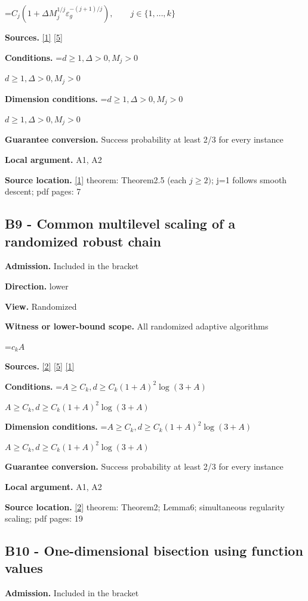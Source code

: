 \documentclass[10pt,a4paper]{article}
\newcommand{\AtlasMath}[1]{\par\begingroup\centering\setbox0=\hbox{$\displaystyle #1$}\ifdim\wd0>1.4\linewidth\typeout{ATLAS WIDE FORMULA: \the\wd0}\fi\ifdim\wd0>\linewidth\resizebox{\linewidth}{!}{\box0}\else\box0\fi\par\endgroup}
\newcommand{\AtlasInlineMath}[1]{\begingroup\setbox0=\hbox{$#1$}\ifdim\wd0>.4\linewidth\endgroup\AtlasMath{#1}\else\endgroup$#1$\fi}
\begin{document}
\AtlasMath{C_j(1+\Delta M_j^{1/j}\varepsilon_g^{-(j+1)/j}),\qquad j\in\{1,\ldots,k\}}
\textbf{Sources.} \href{https://optimization-online.org/wp-content/uploads/2015/06/4970.pdf}{[1]} \href{https://arxiv.org/abs/1710.11606v3}{[5]}

\textbf{Conditions.} \AtlasInlineMath{d\ge 1, \Delta>0, M_j>0}

\textbf{Dimension conditions.} \AtlasInlineMath{d\ge 1, \Delta>0, M_j>0}

\textbf{Guarantee conversion.} Success probability at least 2/3 for every instance

\textbf{Local argument.} A1, A2

\textbf{Source location.} \href{https://optimization-online.org/wp-content/uploads/2015/06/4970.pdf}{[1]} theorem: Theorem2.5 (each $j\ge 2)$; j=1 follows smooth descent; pdf pages: 7

\subsection{B9 - Common multilevel scaling of a randomized robust chain}
\textbf{Admission.} Included in the bracket

\textbf{Direction.} lower

\textbf{View.} Randomized

\textbf{Witness or lower-bound scope.} All randomized adaptive algorithms

\AtlasMath{c_k A}
\textbf{Sources.} \href{https://arxiv.org/abs/1710.11606}{[2]} \href{https://arxiv.org/abs/1710.11606v3}{[5]} \href{https://optimization-online.org/wp-content/uploads/2015/06/4970.pdf}{[1]}

\textbf{Conditions.} \AtlasInlineMath{A\ge C_k, d\ge C_k(1+A)^2 \log(3+A)}

\textbf{Dimension conditions.} \AtlasInlineMath{A\ge C_k, d\ge C_k(1+A)^2 \log(3+A)}

\textbf{Guarantee conversion.} Success probability at least 2/3 for every instance

\textbf{Local argument.} A1, A2

\textbf{Source location.} \href{https://arxiv.org/abs/1710.11606}{[2]} theorem: Theorem2; Lemma6; simultaneous regularity scaling; pdf pages: 19

\subsection{B10 - One-dimensional bisection using function values}
\textbf{Admission.} Included in the bracket
\end{document}
